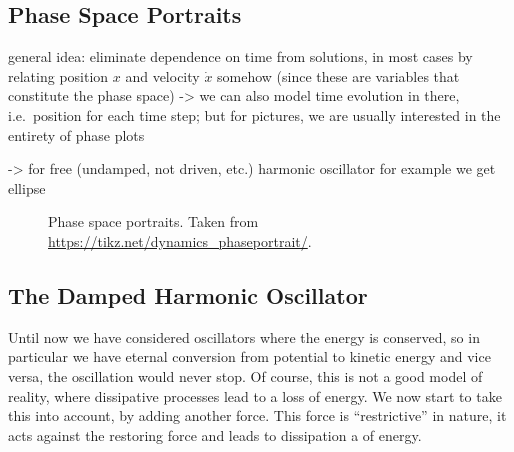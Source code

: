 \documentclass[../class_mech_main.tex]{subfiles}
\begin{document}
		\subsection{Phase Space Portraits}
general idea: eliminate dependence on time from solutions, in most cases by relating position $x$ and velocity $\dot{x}$ somehow (since these are variables that constitute the phase space) -> we can also model time evolution in there, i.e.~position for each time step; but for pictures, we are usually interested in the entirety of phase plots

-> for free (undamped, not driven, etc.) harmonic oscillator for example we get ellipse



\begin{figure}
	\centering


	\hspace*{0.1\textwidth}%

	\hspace*{0.1\textwidth}%

	\caption{Phase space portraits. Taken from \url{https://tikz.net/dynamics_phaseportrait/}.}
	\label{fig:harm_osc_phase_space}
\end{figure}



		\subsection{The Damped Harmonic Oscillator}
Until now we have considered oscillators where the energy is conserved, so in particular we have eternal conversion from potential to kinetic energy and vice versa, the oscillation would never stop. Of course, this is not a good model of reality, where dissipative processes lead to a loss of energy. We now start to take this into account, by adding another force. This force is \enquote{restrictive} in nature, it acts against the restoring force and leads to dissipation a of energy.
\end{document}
